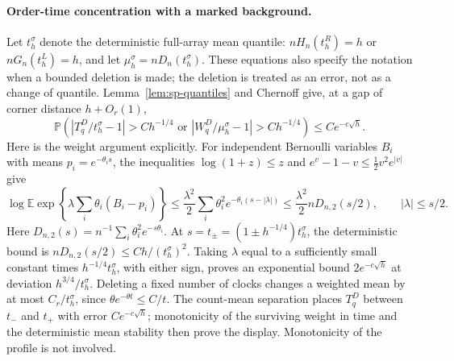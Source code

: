 \documentclass[11pt]{article}
\theoremstyle{remark}
\theoremstyle{plain}
\newcommand{\E}{\mathbb E}
\newcommand{\Pp}{\mathbb P}
\begin{document}
\paragraph{Order-time concentration with a marked background.}
Let $t_h^\sigma$ denote the deterministic full-array mean quantile:
$nH_n(t_h^R)=h$ or $nG_n(t_h^L)=h$, and let
$\mu_h^\sigma=nD_n(t_h^\sigma)$.  These equations also specify the
notation when a bounded deletion is made; the deletion is treated as an
error, not as a change of quantile.
Lemma~\ref{lem:sp-quantiles} and Chernoff give, at a gap of corner
distance $h+O_r(1)$,
\begin{equation}\label{eq:sp-joint-population-concentration}
 \Pp\left(
   |T_q^D/t_h^\sigma-1|>Ch^{-1/4}
   \text{ or }|W_q^D/\mu_h^\sigma-1|>Ch^{-1/4}
        \right)
 \le Ce^{-c\sqrt h}.
\end{equation}
Here is the weight argument explicitly.  For independent Bernoulli
variables $B_i$ with means $p_i=e^{-\theta_i s}$, the inequalities
$\log(1+z)\le z$ and
$e^v-1-v\le\tfrac12v^2e^{|v|}$ give
\[
 \log\E\exp\left\{\lambda\sum_i\theta_i(B_i-p_i)\right\}
 \le\frac{\lambda^2}{2}\sum_i\theta_i^2
                         e^{-\theta_i(s-|\lambda|)}
 \le\frac{\lambda^2}{2}nD_{n,2}(s/2),
 \qquad |\lambda|\le s/2.
\]
Here $D_{n,2}(s)=n^{-1}\sum_i\theta_i^2e^{-s\theta_i}$.
At $s=t_\pm=(1\pm h^{-1/4})t_h^\sigma$, the deterministic bound is
$nD_{n,2}(s/2)\le Ch/(t_h^\sigma)^2$.
Taking $\lambda$ equal to a sufficiently small constant times
$h^{-1/4}t_h^\sigma$, with either sign, proves an exponential bound
$2e^{-c\sqrt h}$ at deviation $h^{3/4}/t_h^\sigma$.
Deleting a fixed number of clocks changes a weighted mean by at most
$C_r/t_h^\sigma$, since $\theta e^{-\theta t}\le C/t$.
The count-mean separation places $T_q^D$ between $t_-$ and $t_+$ with
error $Ce^{-c\sqrt h}$; monotonicity of the surviving weight in time and
the deterministic mean stability then prove the display.  Monotonicity of
the profile is not involved.
\end{document}
